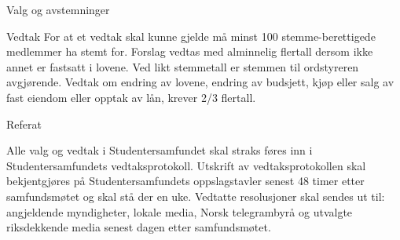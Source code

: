 \begin{lovkapittel}{Valg og avstemninger}
\begin{lovparagraf}{Vedtak}
For at et vedtak skal kunne gjelde må minst 100 stemme-berettigede medlemmer ha stemt for. Forslag vedtas med
alminnelig flertall dersom ikke annet er fastsatt i lovene. Ved likt stemmetall er stemmen til ordstyreren avgjørende.
Vedtak om endring av lovene, endring av budsjett, kjøp eller salg av fast eiendom eller opptak av lån, krever 2/3
flertall.
  
  \end{lovparagraf}
  
  \begin{lovparagraf}{Referat}

Alle valg og vedtak i Studentersamfundet skal straks føres inn i Studentersamfundets vedtaksprotokoll. Utskrift av
vedtaksprotokollen skal bekjentgjøres på Studentersamfundets oppslagstavler senest 48 timer etter samfundsmøtet og
skal stå der en uke. Vedtatte resolusjoner skal sendes ut til: angjeldende myndigheter, lokale media, Norsk
telegrambyrå og utvalgte riksdekkende media senest dagen etter samfundsmøtet.
  
  \end{lovparagraf}
    
\end{lovkapittel}


